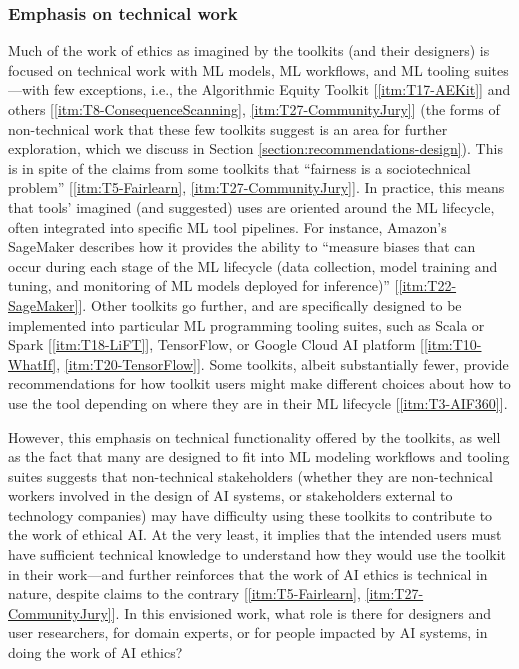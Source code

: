 \documentclass[acmsmall]{acmart}
\begin{document}
\subsubsection{Emphasis on technical work}
Much of the work of ethics as imagined by the toolkits (and their designers) is focused on technical work with ML models, ML workflows, and ML tooling suites---with few exceptions, i.e., the Algorithmic Equity Toolkit [\ref{itm:T17-AEKit}] and others [\ref{itm:T8-ConsequenceScanning}, \ref{itm:T27-CommunityJury}] (the forms of non-technical work that these few toolkits suggest is an area for further exploration, which we discuss in Section \ref{section:recommendations-design}). This is in spite of the claims from some toolkits that ``fairness is a sociotechnical problem'' [\ref{itm:T5-Fairlearn}, \ref{itm:T27-CommunityJury}]. In practice, this means that tools’ imagined (and suggested) uses are oriented around the ML lifecycle, often integrated into specific ML tool pipelines. For instance, Amazon’s SageMaker describes how it provides the ability to ``measure biases that can occur during each stage of the ML lifecycle (data collection, model training and tuning, and monitoring of ML models deployed for inference)'' [\ref{itm:T22-SageMaker}]. Other toolkits go further, and are specifically designed to be implemented into particular ML programming tooling suites, such as Scala or Spark [\ref{itm:T18-LiFT}], TensorFlow, or Google Cloud AI platform [\ref{itm:T10-WhatIf}, \ref{itm:T20-TensorFlow}]. Some toolkits, albeit substantially fewer, provide recommendations for how toolkit users might make different choices about how to use the tool depending on where they are in their ML lifecycle [\ref{itm:T3-AIF360}]. 

However, this emphasis on technical functionality offered by the toolkits, as well as the fact that many are designed to fit into ML modeling workflows and tooling suites suggests that non-technical stakeholders (whether they are non-technical workers involved in the design of AI systems, or stakeholders external to technology companies) may have difficulty using these toolkits to contribute to the work of ethical AI. At the very least, it implies that the intended users must have sufficient technical knowledge to understand how they would use the toolkit in their work---and further reinforces that the work of AI ethics is technical in nature, despite claims to the contrary [\ref{itm:T5-Fairlearn}, \ref{itm:T27-CommunityJury}]. In this envisioned work, what role is there for designers and user researchers, for domain experts, or for people impacted by AI systems, in doing the work of AI ethics?
\end{document}
